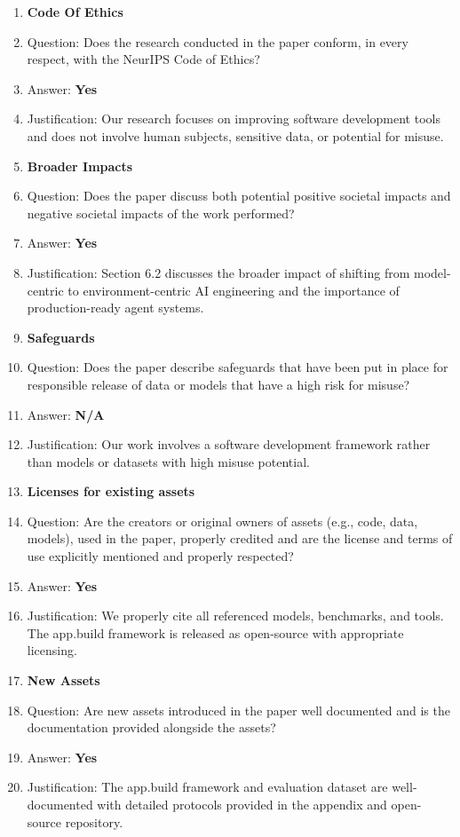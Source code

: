 \documentclass{article}
\begin{document}
\begin{enumerate}
\item {\bf Code Of Ethics}
    \item[] Question: Does the research conducted in the paper conform, in every respect, with the NeurIPS Code of Ethics?
    \item[] Answer: \textbf{Yes}
    \item[] Justification: Our research focuses on improving software development tools and does not involve human subjects, sensitive data, or potential for misuse.

\item {\bf Broader Impacts}
    \item[] Question: Does the paper discuss both potential positive societal impacts and negative societal impacts of the work performed?
    \item[] Answer: \textbf{Yes}
    \item[] Justification: Section 6.2 discusses the broader impact of shifting from model-centric to environment-centric AI engineering and the importance of production-ready agent systems.

\item {\bf Safeguards}
    \item[] Question: Does the paper describe safeguards that have been put in place for responsible release of data or models that have a high risk for misuse?
    \item[] Answer: \textbf{N/A}
    \item[] Justification: Our work involves a software development framework rather than models or datasets with high misuse potential.

\item {\bf Licenses for existing assets}
    \item[] Question: Are the creators or original owners of assets (e.g., code, data, models), used in the paper, properly credited and are the license and terms of use explicitly mentioned and properly respected?
    \item[] Answer: \textbf{Yes}
    \item[] Justification: We properly cite all referenced models, benchmarks, and tools. The app.build framework is released as open-source with appropriate licensing.

\item {\bf New Assets}
    \item[] Question: Are new assets introduced in the paper well documented and is the documentation provided alongside the assets?
    \item[] Answer: \textbf{Yes}
    \item[] Justification: The app.build framework and evaluation dataset are well-documented with detailed protocols provided in the appendix and open-source repository.


\end{enumerate}
\end{document}
